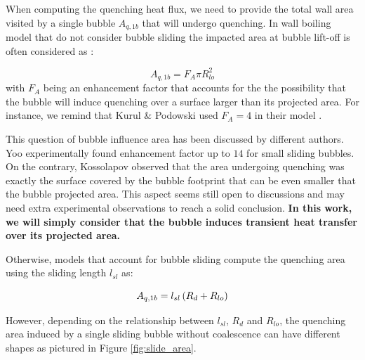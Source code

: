 When computing the quenching heat flux, we need to provide the total wall area visited by a single bubble $A_{q,1b}$ that will undergo quenching. In wall boiling model that do not consider bubble sliding \cite{kurul_multidimensional_1990, guelfi_neptune_2007, podowski_mechanistic_2008} the impacted area at bubble lift-off is often considered as :

\begin{equation}
A_{q,1b} = F_{A} \pi R_{lo}^{2}
\end{equation} 
with $F_{A}$ being an enhancement factor that accounts for the the possibility that the bubble will induce quenching over a surface larger than its projected area. For instance, we remind that Kurul \& Podowski used $F_{A}=4$ in their model \cite{kurul_multidimensional_1990}.

\npar
\begin{remark*}{}
This question of bubble influence area has been discussed by different authors. Yoo \etal \cite{yoo_area_2018} experimentally found enhancement factor up to $14$ for small sliding bubbles. On the contrary, Kossolapov \cite{kossolapov_experimental_2021} observed that the area undergoing quenching was exactly the surface covered by the bubble footprint that can be even smaller that the bubble projected area. This aspect seems still open to discussions and may need extra experimental observations to reach a solid conclusion. \textbf{In this work, we will simply consider that the bubble induces transient heat transfer over its projected area.}
\end{remark*}


\npar

Otherwise, models that account for bubble sliding \cite{basu_wall_2005, yeoh_fundamental_2008, gilman_self-consistent_2017, kommajosyula_development_2020} compute the quenching area using the sliding length $l_{sl}$ as:

\begin{equation}
A_{q,1b} = l_{sl}\left( R_{d} + R_{lo} \right)
\end{equation}

However, depending on the relationship between $l_{sl}$, $R_{d}$ and $R_{lo}$, the quenching area induced by a single sliding bubble without coalescence can have different shapes as pictured in Figure \ref{fig:slide_area}.


